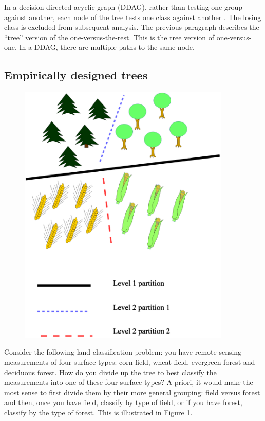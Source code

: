 \documentclass{article}
\begin{document}
In a decision directed acyclic graph (DDAG), 
rather than testing one group against another, 
each node of the tree tests one class against another \citep{Platt_etal2000}. 
The losing class is excluded from subsequent analysis. 
The previous paragraph describes the ``tree'' version of the one-versus-the-rest. 
This is the tree version of one-versus-one. 
In a DDAG, there are multiple paths to the same node.

\subsection{Empirically designed trees}

\begin{figure}
	\includegraphics[width=0.9\textwidth]{landclasstree.eps}
	\label{landclasstree}
\end{figure}

Consider the following land-classification problem: you have remote-sensing measurements of four surface types: corn field, wheat field, evergreen forest and deciduous forest.
How do you divide up the tree to best classify the measurements into one of these four surface types?
A priori, it would make the most sense to first divide them by their more general grouping: field versus forest and then, once you have field, classify by type of field, or if you have forest, classify by the type of forest.
This is illustrated in Figure \ref{landclasstree}.
\end{document}
